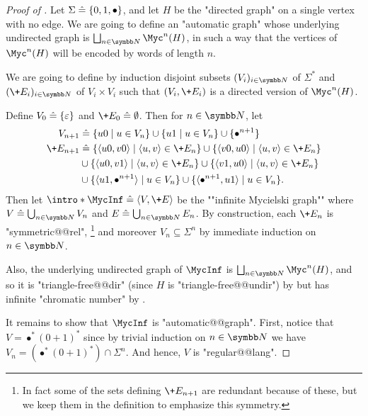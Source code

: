 \begin{proof}[Proof of ]
  Let $\Sigma \mathrel{\hat{=}} \{0,1,\bullet\}$, and let $H$ be the "directed
  graph" on a single vertex with no edge.
  We are going to define an "automatic graph" whose underlying undirected graph
  is $\bigdcup_{n\in\N} \Myc^n(H)$, in such a way that the vertices of $\Myc^n(H)$
  will be encoded by words of length $n$.

  We are going to define by induction
  disjoint subsets $(V_i)_{i\in\N}$ of $\Sigma^*$
  and $(\+E_i)_{i\in\N}$ of $V_i \times V_i$ such that
  $(V_i, \+E_i)$ is a directed version of $\Myc^n(H)$.

  Define $V_0 \mathrel{\hat{=}} \{\varepsilon\}$ and $\+E_0 \defeq \emptyset$.
  Then for $n \in \N$, let
  \begin{align*}
    V_{n+1} & \defeq \{u0\mid u \in V_n\}\cup \{u1\mid u \in V_n\}\cup\{\bullet^{n+1}\}\\
    \+E_{n+1} & \defeq \{\langle u0,v0\rangle \mid \langle u,v\rangle \in \+E_n\}
		\cup \{\langle v0,u0\rangle \mid \langle u,v\rangle \in \+E_n\} \\
		& \cup \{\langle u0,v1\rangle \mid \langle u,v\rangle \in \+E_n\}
		\cup \{\langle v1,u0\rangle \mid \langle u,v\rangle \in \+E_n\} \\
    	& \cup \{\langle u1, \bullet^{n+1}\rangle \mid u\in V_n\}
		\cup \{\langle \bullet^{n+1}, u1\rangle \mid u\in V_n\}.
  \end{align*}
  Then let \AP$\intro*\MycInf \defeq \tup{V, \+E}$ be
  the ""infinite Mycielski graph"" where $V \defeq \bigcup_{n\in \N} V_n$
  and $E \defeq \bigcup_{n\in \N} E_n$.
  By construction, each $\+E_n$ is "symmetric@@rel",%
  \footnote{In fact some of the sets defining $\+E_{n+1}$ are redundant because of these,
  but we keep them in the definition to emphasize this symmetry.}
  and moreover $V_n \subseteq \Sigma^n$ by immediate induction on $n\in\N$.

  Also, the underlying undirected graph of $\MycInf$ is
  $\bigdcup_{n\in\N} \Myc^n(H)$, and so it is "triangle-free@@dir" (since $H$ is "triangle-free@@undir") by  but has infinite
  "chromatic number" by . 
  
  It remains to show that $\MycInf$ is "automatic@@graph".
  First, notice that $V = \bullet^*(0+1)^*$ since by trivial induction
  on $n\in\N$ we have $V_n = (\bullet^*(0+1)^*)\cap \Sigma^n$. And hence,
  $V$ is "regular@@lang".


\end{proof}
